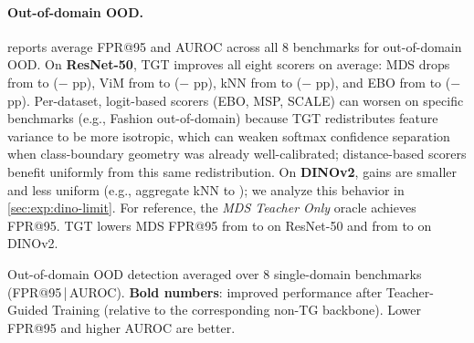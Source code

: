 \documentclass[runningheads]{llncs}
\begin{document}
\paragraph{Out-of-domain OOD.}
 reports average FPR@95 and AUROC across all 8 benchmarks for out-of-domain OOD.
On \textbf{ResNet-50}, TGT improves all eight scorers on average: MDS drops from \FaroodMDSStdResNet{} to \FaroodMDSTGTResNet{} ($-$\FaroodMDSImprovementPPResNet{} pp), ViM from \FaroodViMStdResNet{} to \FaroodViMTGTResNet{} ($-$\FaroodViMImprovementPPResNet{} pp), kNN from \FaroodKnnStdResNet{} to \FaroodKnnTGTResNet{} ($-$\FaroodKnnImprovementPPResNet{} pp), and EBO from \FaroodEBOStdResNet{} to \FaroodEBOTGTResNet{} ($-$\FaroodEBOImprovementPPResNet{} pp). Per-dataset, logit-based scorers (EBO, MSP, SCALE) can worsen on specific benchmarks (e.g., Fashion out-of-domain) because TGT redistributes feature variance to be more isotropic, which can weaken softmax confidence separation when class-boundary geometry was already well-calibrated; distance-based scorers benefit uniformly from this same redistribution.
On \textbf{DINOv2}, gains are smaller and less uniform (e.g., aggregate kNN \FaroodKnnStdDino{} to \FaroodKnnTGTDino{}); we analyze this behavior in \cref{sec:exp:dino-limit}.
For reference, the \emph{MDS Teacher Only} oracle achieves \TeacherOnlyFaroodFPR{} FPR@95. TGT lowers MDS FPR@95 from \FaroodMDSStdResNet{} to \FaroodMDSTGTResNet{} on ResNet-50 and from \FaroodMDSStdDino{} to \FaroodMDSTGTDino{} on DINOv2.

\begin{table}[t]
  \centering
  \caption{Out-of-domain OOD detection averaged over 8 single-domain benchmarks (FPR@95\,|\,AUROC). \textbf{Bold numbers}: improved performance after Teacher-Guided Training (relative to the corresponding non-TG backbone). Lower FPR@95 and higher AUROC are better.}
  \label{tab:farood}
  \small
  \begin{adjustbox}{max width=\columnwidth}
  
  \end{adjustbox}
\end{table}
\end{document}
